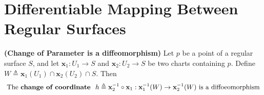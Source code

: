 \documentclass{report}
\begin{document}
\section{Differentiable Mapping Between Regular Surfaces}
\begin{theorem}
\label{CoP}
\textbf{(Change of Parameter is a diffeomorphism)} Let $p$ be a point of a regular surface $S$, and let $\textbf{x}_1:U_1\rightarrow S$ and $\textbf{x}_2:U_2\rightarrow S$ be two charts containing $p$. Define $W\triangleq \textbf{x}_1(U_1)\cap \textbf{x}_2(U_2)\cap S$. Then 
\begin{align*}
  \text{ The \textbf{change of coordinate } $h\triangleq \textbf{x}_2^{-1}\circ \textbf{x}_1:\textbf{x}_1^{-1}(W)\to \textbf{x}_2^{-1}(W)$ is a diffoeomorphism }
\end{align*}
\end{theorem}
\end{document}
